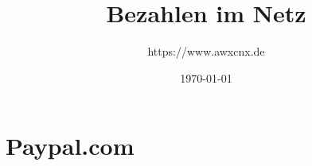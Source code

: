 \documentclass[notitlepage,a4paper,10pt]{article}
\title{Bezahlen im Netz}
\author{https://www.awxcnx.de}
\date{\today}
\begin{document}
\maketitle


\section{Paypal.com}

\end{document}

